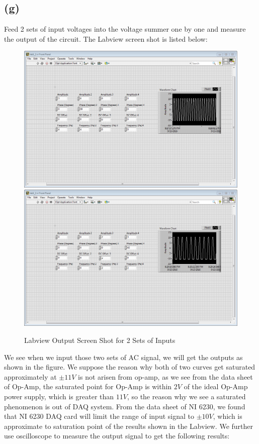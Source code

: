 \documentclass[letterpaper]{article}
\begin{document}
\subsection*{(g)}
Feed 2 sets of input voltages into the voltage summer one by one and measure the output of the circuit. The Labview screen shot is listed below:
\begin{figure}[H]
	\centering
	\includegraphics[scale=0.4]{g_set1.PNG}
	\includegraphics[scale=0.4]{g_set2.PNG}
	\caption{Labview Output Screen Shot for 2 Sets of Inputs}
	\label{fig:scs}
\end{figure}
We see when we input those two sets of AC signal, we will get the outputs as shown in the figure. We suppose the reason why both of two curves get saturated approximately at $\pm 11 V$ is not arisen from op-amp, as we see from the data sheet of Op-Amp, the saturated point for Op-Amp is within $2 V$ of the ideal Op-Amp power supply, which is greater than $11 V$, so the reason why we see a saturated phenomenon is out of DAQ system. From the data sheet of  NI 6230, we found that  NI 6230 DAQ card will limit the range of input signal to $\pm 10 V$, which is approximate to saturation point of the results shown in the Labview. We further use oscilloscope to measure the output signal to get the following results:
\end{document}
